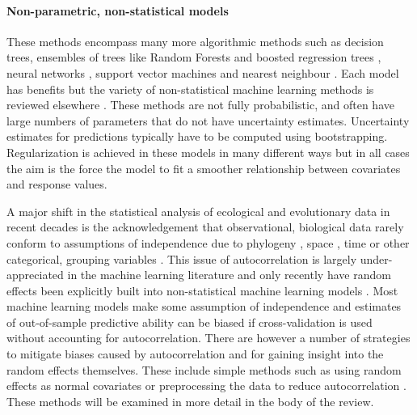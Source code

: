 \documentclass[12pt,]{article}
\let\oldparagraph\paragraph
\renewcommand{\paragraph}[1]{\oldparagraph{#1}\mbox{}}
\begin{document}
\begin{figure*}[t]
{\begin{minipage}{1.\textwidth}
\paragraph{Non-parametric, non-statistical models}
These methods encompass many more algorithmic methods \citep{crisci2012review} such as decision trees, ensembles of trees like Random Forests \citep{breiman2001random} and boosted regression trees \citep{elith2008working, friedman2001greedy}, neural networks \citep{neuralnets}, support vector machines \citep{svm} and nearest neighbour \citep{altman1992introduction}.
Each model has benefits but the variety of non-statistical machine learning methods is reviewed elsewhere \citep{crisci2012review}.
These methods are not fully probabilistic, and often have large numbers of parameters that do not have uncertainty estimates.
Uncertainty estimates for predictions typically have to be computed using bootstrapping.
Regularization is achieved in these models in many different ways but in all cases the aim is the force the model to fit a smoother relationship between covariates and response values.

\end{minipage}

}
\normalcolor
\end{figure*}


A major shift in the statistical analysis of ecological and evolutionary data in recent decades is the acknowledgement that observational, biological data rarely conform to assumptions of independence due to phylogeny \citep{felsenstein1985phylogenies, ives2006statistics}, space \citep{redding2017evaluating, diggle1998model}, time \citep{ives2006statistics} or other categorical, grouping variables \citep{harrison2018brief, bolker2009generalized}.
This issue of autocorrelation is largely under-appreciated in the machine learning literature and only recently have random effects been explicitly built into non-statistical machine learning models \citep{eo2014tree, hajjem2014mixed, hajjem2017generalized, miller2017gradient}.
Most machine learning models make some assumption of independence and estimates of out-of-sample predictive ability can be biased if cross-validation is used without accounting for autocorrelation.
There are however a number of strategies to mitigate biases caused by autocorrelation and for gaining insight into the random effects themselves.
These include simple methods such as using random effects as normal covariates or preprocessing the data to reduce autocorrelation \citep{elith2010art}.
These methods will be examined in more detail in the body of the review.
\end{document}
